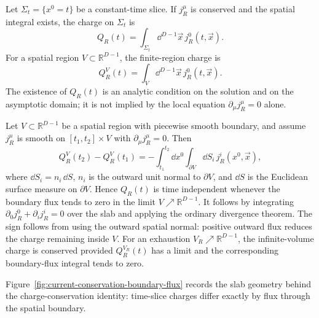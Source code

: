 \begin{definition}
\label{def:classical-current-charge}
Let \(\Sigma_t=\{x^0=t\}\) be a constant-time slice.  If \(j_R^\mu\) is
conserved and the spatial integral exists, the charge on \(\Sigma_t\) is
\[
  Q_R(t)=\int_{\Sigma_t}\dd^{D-1}\vec x\,j_R^0(t,\vec x).
\]
For a spatial region \(V\subset\mathbb R^{D-1}\), the finite-region charge is
\[
  Q_R^V(t)=\int_V\dd^{D-1}\vec x\,j_R^0(t,\vec x).
\]
The existence of \(Q_R(t)\) is an analytic condition on the solution and on
the asymptotic domain; it is not implied by the local equation
\(\partial_\mu j_R^\mu=0\) alone.
\end{definition}

\begin{remark}
\label{rem:charge-balance-spacetime-slab}
Let \(V\subset\mathbb R^{D-1}\) be a spatial region with piecewise smooth
boundary, and assume \(j_R^\mu\) is smooth on
\([t_1,t_2]\times V\) with \(\partial_\mu j_R^\mu=0\).  Then
\[
  Q_R^V(t_2)-Q_R^V(t_1)
  =
  -\int_{t_1}^{t_2}\dd x^0
  \int_{\partial V}\dd S_i\,j_R^i(x^0,\vec x),
\]
where \(\dd S_i=n_i\,\dd S\), \(n_i\) is the outward unit normal to
\(\partial V\), and \(\dd S\) is the Euclidean surface measure on
\(\partial V\).  Hence \(Q_R(t)\) is time independent whenever the boundary
flux tends to zero in the limit \(V\nearrow\mathbb R^{D-1}\).
It follows by integrating
\(\partial_0 j_R^0+\partial_i j_R^i=0\) over the slab and applying the
ordinary divergence theorem.  The sign follows from using the outward
spatial normal: positive outward flux reduces the charge remaining inside
\(V\).  For an exhaustion \(V_R\nearrow\mathbb R^{D-1}\), the
infinite-volume charge is conserved provided \(Q_R^{V_R}(t)\) has a limit
and the corresponding boundary-flux integral tends to zero.
\end{remark}

Figure~\ref{fig:current-conservation-boundary-flux} records the slab geometry
behind the charge-conservation identity: time-slice charges differ exactly by
flux through the spatial boundary.

